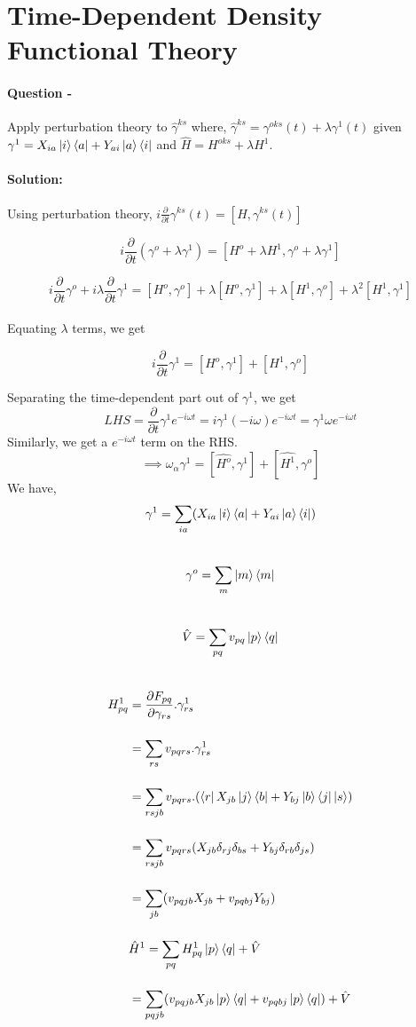 \documentclass[12pt]{article}
\begin{document}
\section{Time-Dependent Density Functional Theory}

\paragraph{Question -}
Apply perturbation theory to $\hat{\gamma}^{ks}$ where, $\hat{\gamma}^{ks} = \gamma^{oks}(t) + 
\lambda \gamma^{1}(t)$ given $\gamma^{1} = X_{ia} \ket{i} \bra{a} + Y_{ai}\ket{a} \bra{i}$ and 
$\hat{H} = H^{oks} + \lambda H^1$.

\paragraph{Solution:}
Using perturbation theory, $i \frac{\partial}{\partial t} \gamma^{ks}(t) = [H , \gamma^{ks}(t)]$

\[ i \frac{\partial}{\partial t} (\gamma^o + \lambda \gamma^1) = [ H^o + \lambda H^1 , \gamma^o + \lambda \gamma^1] \]

\[ i \frac{\partial}{\partial t} \gamma^o + i \lambda \frac{\partial}{\partial t}\gamma^1 = [H^o , 
\gamma^o] + \lambda [H^o , \gamma^1] + \lambda [H^1 , \gamma^o] + \lambda^2 [H^1 , \gamma^1] \]
\\
Equating $\lambda$ terms, we get 

\[ i \frac{\partial}{\partial t} \gamma^1 = [H^o , \gamma^1] + [H^1 , \gamma^o]\]

Separating the time-dependent part out of $\gamma^1$, we get
\[ LHS = \frac{\partial}{\partial t} \gamma^1 e^{-i \omega t} = i \gamma^1 (-i \omega) e^{-i \omega t} = 
\gamma^1 \omega e^{-i \omega t} \]  
Similarly, we get a $e^{-i\omega t}$ term on the RHS.
\\
\[ \implies \omega_\alpha \gamma^1 = [\hat{H^o} , \gamma^1] + [\hat{H^1} , \gamma^o]  
\]
We have,
\[ \gamma^1 = \sum_{ia} (X_{ia} \ket{i}\bra{a} + Y_{ai} \ket{a}\bra{i})  \]
\\
\[ \gamma^o = \sum_{m} \ket{m}\bra{m}\]
\\
\[ \hat{V} = \sum_{pq} v_{pq} \ket{p}\bra{q} \]
\\
\begin{align*}
    H_{pq}^1 &= \frac{\partial F_{pq}}{\partial \gamma_{rs}}.\gamma_{rs}^1 \\[12pt]
    &= \sum_{rs}v_{pqrs}.\gamma_{rs}^1 \\[12pt]
    &=\sum_{rsjb} v_{pqrs} . ( \bra{r} X_{jb} \ket{j}\bra{b} + Y_{bj} \ket{b}\bra{j} \ket{s}) \\[12pt]
    &=\sum_{rsjb} v_{pqrs} ( X_{jb} \delta_{rj} \delta_{bs} + Y_{bj} \delta_{rb} \delta_{js}) \\[12pt]
    &=\sum_{jb} (v_{pqjb} X_{jb} + v_{pqbj} Y_{bj}) \\[12pt]
    &\hat{H}^1 = \sum_{pq} H_{pq}^1 \ket{p}\bra{q} + \hat{V}\\[12pt]
    &=\sum_{pqjb} (v_{pqjb} X_{jb} \ket{p}\bra{q} + v_{pqbj} \ket{p}\bra{q} ) + \hat{V}
\end{align*}
\end{document}
